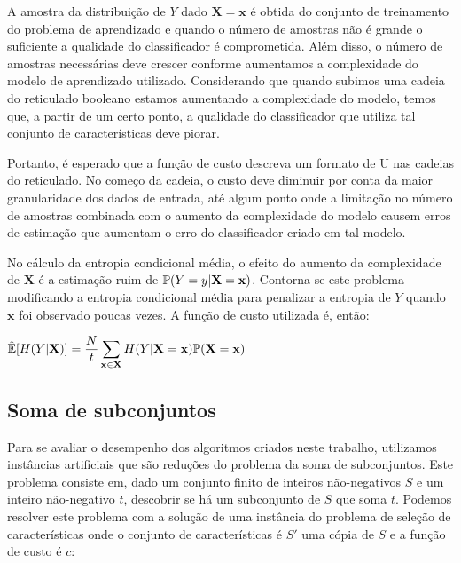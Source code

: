 A amostra da distribuição de $Y$ dado $\mathbf{X = x}$ é obtida do 
conjunto de treinamento do problema de aprendizado e quando o número
de amostras não é grande o suficiente a qualidade do classificador 
é comprometida. Além disso, o número de amostras necessárias deve
crescer conforme aumentamos a complexidade do modelo de aprendizado 
utilizado. Considerando que quando subimos uma cadeia do reticulado 
booleano estamos aumentando a complexidade do modelo, temos que, a
partir de um certo ponto, a qualidade do classificador que utiliza tal 
conjunto de características deve piorar. 

Portanto, é esperado que a função de custo descreva um formato de U nas 
cadeias do reticulado. No começo da cadeia, o custo deve diminuir por 
conta da maior granularidade dos dados de entrada, até algum ponto onde
a limitação no número de amostras combinada com o aumento da 
complexidade do modelo causem erros de estimação que aumentam o erro
do classificador criado em tal modelo.

No cálculo da entropia condicional média, o efeito do aumento da 
complexidade de $\mathbf X$ é a estimação ruim de 
$\mathbb{P} (Y = y | \mathbf{X = x})$. Contorna-se este problema 
modificando a entropia condicional média para penalizar a entropia de 
$Y$ quando $\mathbf{x}$ foi observado poucas vezes. A função de custo
utilizada é, então:

\begin{center}
$
\begin{aligned}
    \hat{\mathbb{E}}[H (Y | \mathbf{X})] = \frac{N}{t}
    \sum_{\mathbf{x} \in \mathbf{X}} H (Y | \mathbf{X = x}) \mathbb{P} (\mathbf{X = x})
\end{aligned}
$
\end{center}

\subsection{Soma de subconjuntos}
Para se avaliar o desempenho dos algoritmos criados neste trabalho, 
utilizamos instâncias artificiais que são reduções do problema da soma
de subconjuntos. Este problema consiste em, dado um conjunto finito de
inteiros não-negativos $S$ e um inteiro não-negativo $t$, descobrir se
há um subconjunto de $S$ que soma $t$. Podemos resolver este problema 
com a solução de uma instância do problema de seleção de características
onde o conjunto de características é $S'$ uma cópia de $S$ e a função de
custo é $c$:


